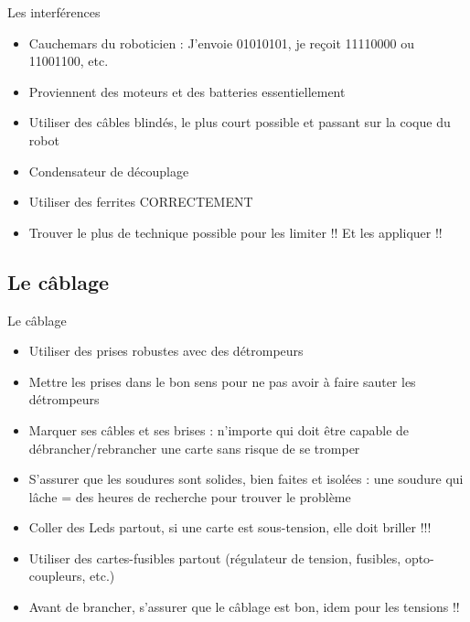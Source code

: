 \documentclass{beamer}
\begin{document}
\begin{frame}{Les interférences}
	\begin{itemize}
		\item Cauchemars du roboticien : J'envoie 01010101, je reçoit 11110000 ou 11001100, etc.
		\item Proviennent des moteurs et des batteries essentiellement
		\item Utiliser des câbles blindés, le plus court possible et passant sur la coque du robot
		\item Condensateur de découplage
		\item Utiliser des ferrites CORRECTEMENT
		\item Trouver le plus de technique possible pour les limiter !! Et les appliquer !!
	\end{itemize}
\end{frame}

\subsection{Le câblage}
\begin{frame}{Le câblage}
	\begin{itemize}
		\item Utiliser des prises robustes avec des détrompeurs
		\item Mettre les prises dans le bon sens pour ne pas avoir à faire sauter les détrompeurs
		\item Marquer ses câbles et ses brises : n'importe qui doit être capable de débrancher/rebrancher une carte sans risque de se tromper
		\item S'assurer que les soudures sont solides, bien faites et isolées : une soudure qui lâche = des heures de recherche pour trouver le problème
		\item Coller des Leds partout, si une carte est sous-tension, elle doit briller !!!
		\item Utiliser des cartes-fusibles partout (régulateur de tension, fusibles, opto-coupleurs, etc.)
		\item Avant de brancher, s'assurer que le câblage est bon, idem pour les tensions !!
	\end{itemize}
\end{frame}
\end{document}
